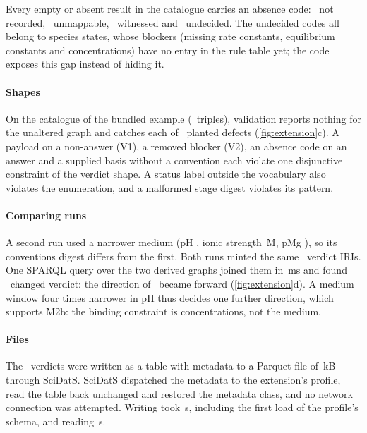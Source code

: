 Every empty or absent result in the catalogue carries an absence code: \xGateNotRecorded\ not recorded, \xGateOpen\ unmappable, \xGateWitnessed\ witnessed and \xGateUndecided\ undecided.
The undecided codes all belong to species states, whose blockers (missing rate constants, equilibrium constants and concentrations) have no entry in the rule table yet; the code exposes this gap instead of hiding it.

\paragraph{Shapes}
On the catalogue of the bundled example (\xControlTriples\ triples), validation reports nothing for the unaltered graph and catches each of \xControlCaught\ planted defects (\cref{fig:extension}c).
A payload on a non-answer (V1), a removed blocker (V2), an absence code on an answer and a supplied basis without a convention each violate one disjunctive constraint of the verdict shape.
A status label outside the vocabulary also violates the enumeration, and a malformed stage digest violates its pattern.

\paragraph{Comparing runs}
A second run used a narrower medium (pH \xNarrowPh, ionic strength \xNarrowI\,M, pMg \xNarrowPmg), so its conventions digest differs from the first.
Both runs minted the same \xShared\ verdict IRIs.
One SPARQL query over the two derived graphs joined them in \xJoinMs\,ms and found \xChanged\ changed verdict: the direction of \xChangedReaction\ became forward (\cref{fig:extension}d).
A medium window four times narrower in pH thus decides one further direction, which supports M2b: the binding constraint is concentrations, not the medium.

\paragraph{Files}
The \xParquetRows\ verdicts were written as a table with  metadata to a Parquet file of \xParquetKB\,kB through SciDatS.
SciDatS dispatched the metadata to the extension's profile, read the table back unchanged and restored the metadata class, and no network connection was attempted.
Writing took \xParquetWrite\,s, including the first load of the profile's schema, and reading \xParquetRead\,s.

